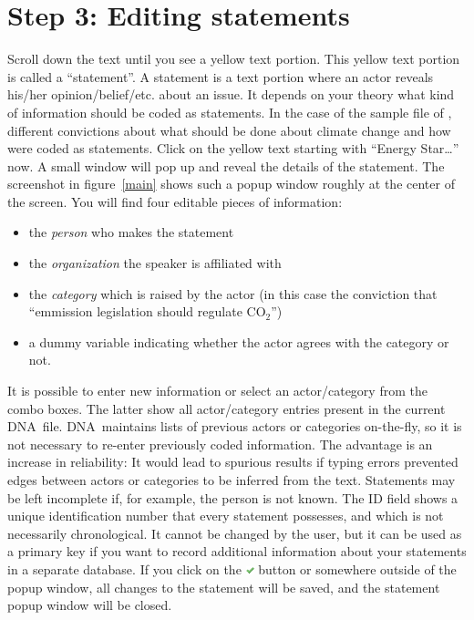 \documentclass[12pt,a4paper]{scrreprt}
\newcommand{\dnashort}{\textsc{DNA}}
\begin{document}
\section*{Step 3: Editing statements}
Scroll down the text until you see a yellow text portion. This yellow text portion is called a ``statement''. A statement is a text portion where an actor reveals his/her opinion/belief/etc. about an issue. It depends on your theory what kind of information should be coded as statements. In the case of the sample file of \citet{fisher2012mapping}, different convictions about what should be done about climate change and how were coded as statements. Click on the yellow text starting with ``Energy Star\ldots'' now. A small window will pop up and reveal the details of the statement. The screenshot in figure~\ref{main} shows such a popup window roughly at the center of the screen. You will find four editable pieces of information:
\begin{itemize}
 \item the \emph{person} who makes the statement
 \item the \emph{organization} the speaker is affiliated with
 \item the \emph{category} which is raised by the actor (in this case the conviction that ``emmission legislation should regulate CO$_2$'')
 \item a dummy variable indicating whether the actor agrees with the category or not.
\end{itemize}
 It is possible to enter new information or select an actor/category from the combo boxes. The latter show all actor/category entries present in the current \dnashort\ file. \dnashort\ maintains lists of previous actors or categories on-the-fly, so it is not necessary to re-enter previously coded information. The advantage is an increase in reliability: It would lead to spurious results if typing errors prevented edges between actors or categories to be inferred from the text. Statements may be left incomplete if, for example, the person is not known. The ID field shows a unique identification number that every statement possesses, and which is not necessarily chronological. It cannot be changed by the user, but it can be used as a primary key if you want to record additional information about your statements in a separate database. If you click on the \includegraphics[height=9px]{icons-tick.png} button or somewhere outside of the popup window, all changes to the statement will be saved, and the statement popup window will be closed.
\end{document}
